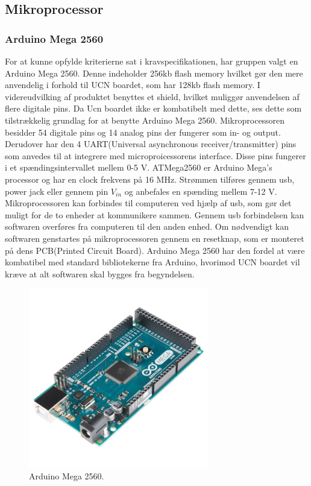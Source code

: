 \subsection{Mikroprocessor}
\subsubsection{Arduino Mega 2560}
For at kunne opfylde kriterierne sat i kravspecifikationen, har gruppen valgt en Arduino Mega 2560. Denne indeholder 256kb flash memory hvilket gør den mere anvendelig i forhold til UCN boardet, som har 128kb flash memory. I videreudvilking af produktet benyttes et shield, hvilket muliggør anvendelsen af flere digitale pins. Da Ucn boardet ikke er kombatibelt med dette, ses dette som tilstrækkelig grundlag for at benytte Arduino Mega 2560. 
\newline
Mikroprocessoren besidder 54 digitale pins og 14 analog pins der fungerer som in- og output. Derudover har den 4 UART(Universal asynchronous receiver/transmitter) pins som anvedes til at integrere med microproicessorens interface. \newline
Disse pins fungerer i et spændingsintervallet mellem 0-5 V. 
\newline
ATMega2560 er Arduino Mega's processor og har en clock frekvens på 16 MHz. Strømmen tilføres gennem usb, power jack eller gennem pin $V_{in}$ og anbefales en spænding mellem 7-12 V. 
\newline
Mikroprocessoren kan forbindes til computeren ved hjælp af usb, som gør det muligt for de to enheder at kommunikere sammen. Gennem usb forbindelsen kan softwaren overføres fra computeren til den anden enhed. Om nødvendigt kan softwaren genstartes på mikroprocessoren gennem en resetknap, som er monteret på dens PCB(Printed Circuit Board).
\newline 
Arduino Mega 2560 har den fordel at være kombatibel med standard bibliotekerne fra Arduino, hvorimod UCN boardet vil kræve at alt softwaren skal bygges fra begyndelsen.

\begin{figure}[h!]
  \centering
  \includegraphics[width=0.7\textwidth]{figures/arduinoMega.jpg}
  \caption{Arduino Mega 2560.}
  \label{arduino2569}
\end{figure} 

\newpage



